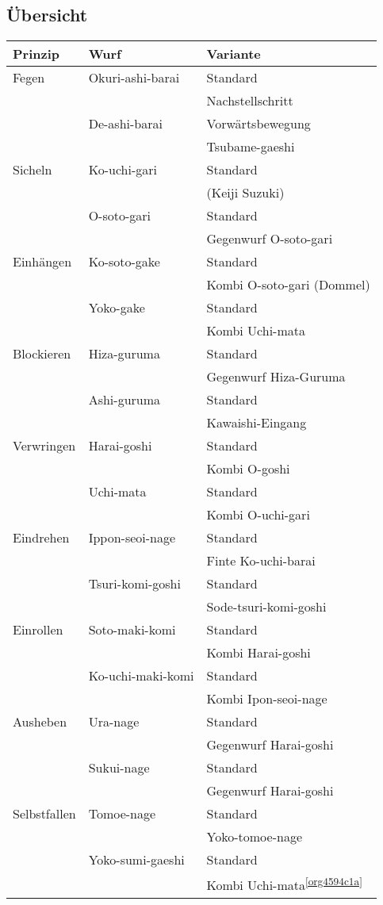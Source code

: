 \documentclass[justified, a4paper, notitlepage, captions=tableheading, nobib]{tufte-handout}
\begin{document}
\subsection{Übersicht}
\label{sec:orgd634129}
\begin{center}
\begin{tabular}{lll}
Prinzip & Wurf & Variante\\
\hline
Fegen & Okuri-ashi-barai & Standard\\
 &  & Nachstellschritt\\
 & De-ashi-barai & Vorwärtsbewegung\\
 &  & Tsubame-gaeshi\\
Sicheln & Ko-uchi-gari & Standard\\
 &  & (Keiji Suzuki)\footnotemark\\
 & O-soto-gari & Standard\\
 &  & Gegenwurf O-soto-gari\\
Einhängen & Ko-soto-gake & Standard\\
 &  & Kombi O-soto-gari (Dommel)\\
 & Yoko-gake & Standard\\
 &  & Kombi Uchi-mata\footnotemark\\
Blockieren & Hiza-guruma & Standard\\
 &  & Gegenwurf Hiza-Guruma\\
 & Ashi-guruma & Standard\\
 &  & Kawaishi-Eingang\\
Verwringen & Harai-goshi & Standard\\
 &  & Kombi O-goshi\\
 & Uchi-mata & Standard\\
 &  & Kombi O-uchi-gari\\
Eindrehen & Ippon-seoi-nage & Standard\\
 &  & Finte Ko-uchi-barai\\
 & Tsuri-komi-goshi & Standard\\
 &  & Sode-tsuri-komi-goshi\\
Einrollen & Soto-maki-komi & Standard\\
 &  & Kombi Harai-goshi\\
 & Ko-uchi-maki-komi & Standard\\
 &  & Kombi Ipon-seoi-nage\\
Ausheben & Ura-nage & Standard\\
 &  & Gegenwurf Harai-goshi\\
 & Sukui-nage & Standard\\
 &  & Gegenwurf Harai-goshi\\
Selbstfallen & Tomoe-nage & Standard\\
 &  & Yoko-tomoe-nage\\
 & Yoko-sumi-gaeshi & Standard\\
 &  & Kombi Uchi-mata\textsuperscript{\ref{org4594c1a}}\\
\end{tabular}
\end{center}
\end{document}
